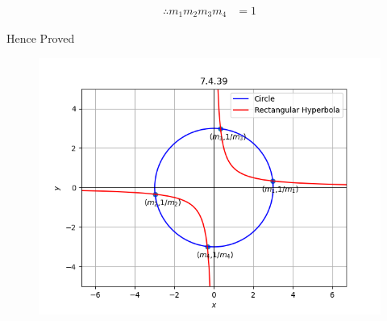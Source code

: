 \documentclass[journal]{IEEEtran}
\numberwithin{equation}{enumi}
\numberwithin{figure}{enumi}
\begin{document}
\begin{align}
    \therefore m_1m_2m_3m_4 &= 1 
\end{align}

Hence Proved

 \begin{figure}[H]
     \centering
     \includegraphics[width=1.0\columnwidth]{figs/graph1.png}
     \caption*{}
     \label{fig:placeholder}
 \end{figure}
\end{document}
